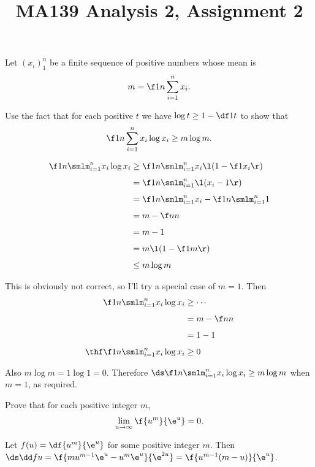 \documentclass[a4paper]{article}
\title{MA139 Analysis 2, Assignment 2}
\begin{document}
\maketitle

\setlength{\parindent}{0em}
\setlength{\parskip}{1em}


\begin{questionbody}
Let ${(x_i)}_1^n$ be a finite sequence of positive numbers whose mean is \[
m = \f1n \sum_{i=1}^n x_i.
\]

Use the fact that for each positive $t$ we have $\log t \ge 1 - \df1t$ to show that \[
\f1n \sum_{i=1}^n x_i \log x_i \ge m \log m.
\]
\end{questionbody}

\begin{align*}
\f1n \smlm_{i=1}^n x_i \log x_i &\ge \f1n \smlm_{i=1}^n x_i \l(1 - \f1{x_i}\r) \\[1ex]
&= \f1n \smlm_{i=1}^n \l(x_i - 1\r) \\[1ex]
&= \f1n \smlm_{i=1}^n x_i - \f1n \smlm_{i=1}^n 1 \\[1ex]
&= m - \f nn \\[1ex]
&= m - 1 \\[1ex]
&= m \l(1 - \f1m\r) \\[1ex]
&\le m \log m
\end{align*}

This is obviously not correct, so I'll try a special case of $m=1$. Then \begin{align*}
\f1n \smlm_{i=1}^n x_i \log x_i &\ge \cdots \\[1ex]
&= m - \f nn \\[1ex]
&= 1 - 1 \\[1ex]
\thf \f1n \smlm_{i=1}^n x_i \log x_i &\ge 0
\end{align*}

Also $m \log m = 1 \log 1 = 0$. Therefore $\ds \f1n \smlm_{i=1}^n x_i \log x_i \ge m \log m$ when $m=1$, as required.


\begin{questionbody}
Prove that for each positive integer $m$, \[
\lim_{u \to \infty} \f{u^m}{\e^u} = 0.
\]
\end{questionbody}

Let $f(u) = \df{u^m}{\e^u}$ for some positive integer $m$. Then $\ds \dd fu = \f{m u^{m-1} \e^u - u^m \e^u}{\e^{2u}} = \f{u^{m-1} (m - u)}{\e^u}$.
\end{document}
